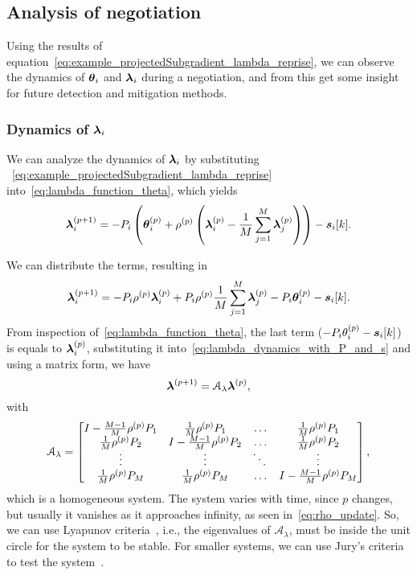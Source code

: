 \documentclass[../main.tex]{subfiles}
\begin{document}
\subsection{Analysis of negotiation}\label{sec:analysis-negotiation}
Using the results of equation~\eqref{eq:example_projectedSubgradient_lambda_reprise}, we can observe the dynamics of $\boldsymbol{\theta}_i$ and $\boldsymbol{\lambda}_i$ during a negotiation, and from this get some insight for future detection and mitigation methods.

\subsubsection{Dynamics of $\boldsymbol{\lambda}_i$}
We can analyze the dynamics of $\boldsymbol{\lambda}_i$ by substituting
~\eqref{eq:example_projectedSubgradient_lambda_reprise} into~\eqref{eq:lambda_function_theta}, which yields
\begin{equation}
  \label{eq:lambda_dynamics}
\boldsymbol{\lambda}_i^{(p+1)}=-P_{i}\left(\boldsymbol{\theta}_i^{(p)}+\rho^{(p)}\left(\boldsymbol{\lambda}_i^{(p)}-\frac{1}{M}\sum_{j=1}^{M}\boldsymbol{\lambda}_j^{(p)}\right)\right)-\boldsymbol{s}_{i}[k].
\end{equation}

We can distribute the terms, resulting in
\begin{equation}
  \label{eq:lambda_dynamics_with_P_and_s}
\boldsymbol{\lambda}_i^{(p+1)}=-P_{i}\rho^{(p)}\boldsymbol{\lambda}_i^{(p)}+P_{i}\rho^{(p)}\frac{1}{M}\sum_{j=1}^{M}\boldsymbol{\lambda}_j^{(p)}-P_{i}\boldsymbol{\theta}_i^{(p)}-\boldsymbol{s}_{i}[k].
\end{equation}
From inspection of~\eqref{eq:lambda_function_theta}, the last term ($-P_{i}\theta_{i}^{(p)}-\boldsymbol{s}_{i}[k]$) is equals to $\boldsymbol{\lambda}_i^{(p)}$, substituting it into~\eqref{eq:lambda_dynamics_with_P_and_s} and using a matrix form, we have
\begin{equation}
  \label{eq:negotiation_equation_substituting_organizing}
  \boldsymbol{\lambda}^{(p+1)}=\mathcal{A}_{\lambda}\boldsymbol{\lambda}^{(p)},
\end{equation}
with
\begin{equation}
\mathcal{A}_{\lambda}=\left[
\begin{matrix}
I-\frac{M-1}{M}\rho\p P_{1} & \frac{1}{M}\rho\p P_{1}&\dots&\frac{1}{M}\rho\p P_{1}\\
\frac{1}{M}\rho\p P_{2}&I-\frac{M-1}{M}\rho\p P_{2}&\dots&\frac{1}{M}\rho\p P_{2}\\
\vdots&\vdots&\ddots&\vdots\\
\frac{1}{M}\rho\p P_{M}&\frac{1}{M}\rho\p P_{M}&\dots&I-\frac{M-1}{M}\rho\p P_{M}\\
\end{matrix}
\right],
\end{equation}
which is a \dt{} homogeneous system.
The system varies with time, since $p$ changes, but usually it vanishes as it approaches infinity, as seen in~\eqref{eq:rho_update}.
So, we can use Lyapunov criteria~\cite[\S8.6]{Hespanha2009}, i.e., the eigenvalues of $\mathcal{A}_{\lambda}$, must be inside the unit circle for the system to be stable.
For smaller systems, we can use Jury's criteria to test the system~\cite{Jury1962}.
\end{document}
